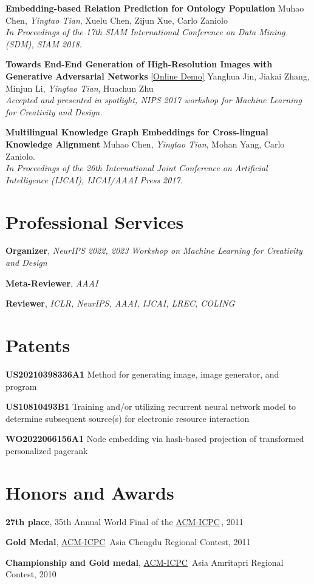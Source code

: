 \documentclass[line,margin]{cv}
\newcommand{\myemph}{\textbf}
\newcommand{\ICPC}{\href{http://icpc.baylor.edu/}{ACM-ICPC}}
\begin{document}
\begin{resume}
  {\bf Embedding-based Relation Prediction for Ontology Population}
  Muhao Chen, \emph{Yingtao Tian}, Xuelu Chen, Zijun Xue, Carlo Zaniolo\\
  \emph{In Proceedings of the 17th SIAM International Conference on Data Mining (SDM), SIAM 2018.}

  {\bf Towards End-End Generation of High-Resolution Images with Generative Adversarial Networks}
  \href{http://make.girls.moe/#/}{[Online Demo]}
  Yanghua Jin, Jiakai Zhang, Minjun Li, \emph{Yingtao Tian}, Huachun Zhu\\
  \emph{Accepted and presented in spotlight, NIPS 2017 workshop for Machine Learning for Creativity and Design.}

  {\bf Multilingual Knowledge Graph Embeddings for Cross-lingual Knowledge Alignment}
  Muhao Chen, \emph{Yingtao Tian}, Mohan Yang, Carlo Zaniolo.\\
  \emph{In Proceedings of the 26th International Joint Conference on Artificial Intelligence (IJCAI), IJCAI/AAAI Press 2017.}

\section{Professional Services }
  \myemph{Organizer}, \emph{NeurIPS 2022, 2023 Workshop on Machine Learning for Creativity and Design}

  \myemph{Meta-Reviewer}, \emph{AAAI}

  \myemph{Reviewer}, \emph{ICLR, NeurIPS, AAAI, IJCAI, LREC, COLING}

\section{Patents}

  \myemph{US20210398336A1} Method for generating image, image generator, and program

  \myemph{US10810493B1} Training and/or utilizing recurrent neural network model to determine subsequent source(s) for electronic resource interaction
  
  \myemph{WO2022066156A1} Node embedding via hash-based projection of transformed personalized pagerank
  

\section{Honors and Awards}
  \myemph{27th place}, 35th Annual World Final of the \ICPC \,, 2011

  \myemph{Gold Medal}, \ICPC\ Asia Chengdu Regional Contest, 2011

  \myemph{Championship and Gold medal}, \ICPC\ Asia Amritapri Regional Contest, 2010

\end{resume}
\end{document}
